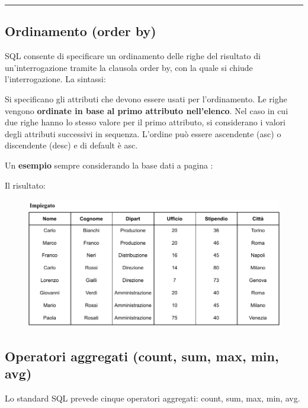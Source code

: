 \documentclass[a4paper]{article}
\newcommand{\longline}{\noindent\rule{\textwidth}{0.4pt}}
\begin{document}
	\longline
	
	\subsection{Ordinamento (\textsf{order by})}
	
	SQL consente di specificare un ordinamento delle righe del risultato di un'interrogazione tramite la clausola \textsf{order by}, con la quale si chiude l'interrogazione. La sintassi:
	
	Si specificano gli attributi che devono essere usati per l'ordinamento. Le righe vengono \textbf{ordinate in base al primo attributo nell'elenco}. Nel caso in cui due righe hanno lo stesso valore per il primo attributo, si considerano i valori degli attributi successivi in sequenza. L'ordine può essere ascendente (\textsf{asc}) o discendente (\textsf{desc}) e di default è \textsf{asc}.\newline
	
	\noindent
	Un \textcolor{Green4}{\textbf{esempio}} sempre considerando la base dati a pagina \pageref{select dbms}:
	
	Il risultato:
	\begin{figure}[!htp]
		\centering
		\includegraphics[width=\textwidth]{img/order_by-ex1.pdf}
	\end{figure}\newpage
	
	\subsection{Operatori aggregati (\textsf{count}, \textsf{sum}, \textsf{max}, \textsf{min}, \textsf{avg})}
	
	Lo standard SQL prevede cinque operatori aggregati: \textsf{count}, \textsf{sum}, \textsf{max}, \textsf{min}, \textsf{avg}.\newline
	
\end{document}
